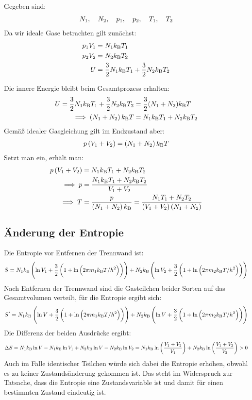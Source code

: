 Gegeben sind:
\[
    N_1
    ,\quad
    N_2
    ,\quad
    p_1
    ,\quad
    p_2
    ,\quad
    T_1
    ,\quad
    T_2
\]
Da wir ideale Gase betrachten gilt zunächst:
\begin{align*}
p_1V_1 &= N_1k_\text B T_1 \\
p_2V_2 &= N_2k_\text B T_2 \\
U &= \frac{3}{2}N_1 k_\text B T_1 + \frac{3}{2} N_2 k_\text BT_2
\end{align*}

Die innere Energie bleibt beim Gesamtprozess erhalten:
\begin{align*}
U = \frac{3}{2} N_1 k_\text B T_1 + \frac{3}{2}N_2 k_\text B T_2 &= \frac{3}{2}(N_1+N_2) k_\text B T \\
\implies \del{N_1+N_2} k_\text BT &= N_1 k_\text B T_1 + N_2 k_\text B T_2 \\
\end{align*}
Gemäß idealer Gasgleichung gilt im Endzustand aber:
\[p\del{V_1+V_2}=\del{N_1+N_2}k_\text BT \]
Setzt man ein, erhält man:
\begin{align*}
p\del{V_1+V_2} &= N_1k_\text BT_1+N_2k_\text BT_2 \\
\implies p &= \frac{N_1k_\text BT_1 + N_2k_\text BT_2}{V_1+V_2} \\
\implies T &= \frac{p}{\del{N_1+N_2}k_\text B}=\frac{N_1T_1 + N_2T_2}{\del{V_1+V_2}\del{N_1+N_2}}
\end{align*}


\subsection{Änderung der Entropie}
Die Entropie vor Entfernen der Trennwand ist:
\[ S = N_1 k_\text B \del{\ln V_1 +\frac{3}{2}\del{1+\ln\del{2\pi m_1 k_\text B T /h^2}}}  + N_2 k_\text B \del{\ln V_2 +\frac{3}{2}\del{1+\ln\del{2\pi m_2 k_\text B T /h^2}}} \]
Nach Entfernen der Trennwand sind die Gasteilchen beider Sorten auf das Gesamtvolumen verteilt, für die Entropie ergibt sich:
\[ S' = N_1 k_\text B \del{\ln V +\frac{3}{2}\del{1+\ln\del{2\pi m_1 k_\text B T /h^2}}}  + N_2 k_\text B \del{\ln V +\frac{3}{2}\del{1+\ln\del{2\pi m_2 k_\text B T /h^2}}} \]
Die Differenz der beiden Ausdrücke ergibt:
\[\Delta S = N_1 k_\text B \ln V - N_1 k_\text B \ln V_1 + N_2 k_\text B \ln V - N_2 k_\text B \ln V_2 = N_1 k_\text B \ln\del{\frac{V_1+V_2}{V_1}} + N_2 k_\text B \ln\del{\frac{V_1+V_2}{V_2}} > 0 \]
Auch im Falle identischer Teilchen würde sich dabei die Entropie erhöhen, obwohl es zu keiner Zustandsänderung gekommen ist. Das steht im Widerspruch zur Tatsache, dass die Entropie eine Zustandsvariable ist und damit für einen bestimmten Zustand eindeutig ist.

